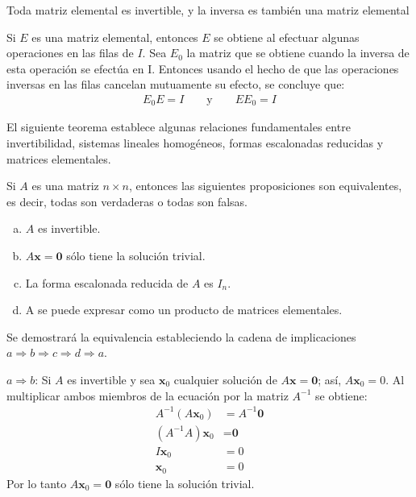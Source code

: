 \documentclass[a4paper,12pt]{article}
\begin{document}
\begin{theorem}
  Toda matriz elemental es invertible, y la inversa es también una matriz
  elemental
  \label{theo:elematr}
\end{theorem}

\demo Si $E$ es una matriz elemental, entonces $E$ se obtiene al efectuar
algunas operaciones en las filas de $I$. Sea $E_0$ la matriz que se obtiene
cuando la inversa de esta operación se efectúa en I. Entonces usando el hecho
de que las operaciones inversas en las filas cancelan mutuamente su efecto, se
concluye que:
\begin{align*}
  E_0E=I \qquad \mbox{y} \qquad EE_0=I
\end{align*}

El siguiente teorema establece algunas relaciones fundamentales entre
invertibilidad, sistemas lineales homogéneos, formas escalonadas reducidas y
matrices elementales.

\begin{theorem}
  Si $A$ es una matriz $n\times n$, entonces las siguientes proposiciones son
  equivalentes, es decir, todas son verdaderas o todas son falsas.
  \begin{enumerate}[(a)]
    \item $A$ es invertible.
    \item $A\mathbf{x}=\textbf{0}$ sólo tiene la solución trivial.
    \item La forma escalonada reducida de $A$ es $I_n$.
    \item A se puede expresar como un producto de matrices elementales.
  \end{enumerate}
  \label{theo:relacfund}
\end{theorem}

\demo Se demostrará la equivalencia estableciendo la cadena de implicaciones
$a\Rightarrow b\Rightarrow c\Rightarrow d\Rightarrow a$.

$a\Rightarrow b$: Si $A$ es invertible y sea  $\mathbf{x}_0$ cualquier solución de
$A\mathbf{x}=\textbf{0}$; así, $A\mathbf{x}_0=0$. Al multiplicar ambos miembros de la
ecuación por la matriz $A^{-1}$ se obtiene:
\begin{align*}
  A^{-1}(A\mathbf{x}_0) &= A^{-1}\textbf{0} \\
  (A^{-1}A)\mathbf{x}_0 &= \textbf{0} \\
  I\mathbf{x}_0 &= 0 \\
  \mathbf{x}_0 &= 0
\end{align*}
Por lo tanto $A\mathbf{x}_0=\textbf{0}$ sólo tiene la solución trivial.
\end{document}
